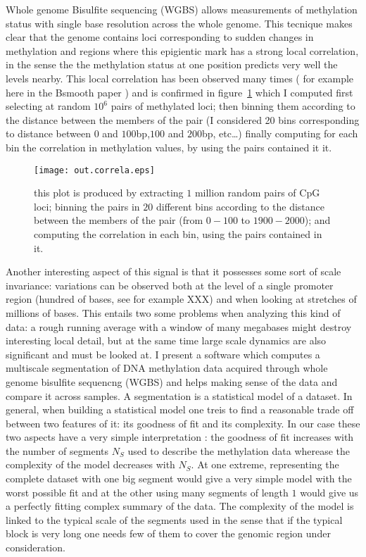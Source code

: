 \documentclass[11pt]{amsart}
\begin{document}
Whole genome Bisulfite sequencing (WGBS) allows measurements of methylation 
status with single base resolution across the whole genome. This tecnique makes 
clear that the genome contains loci corresponding to sudden changes in methylation 
and regions where this epigientic mark has a strong local
correlation, in the sense the the methylation status at one position predicts 
very well the levels nearby. 
This local correlation has been observed many times ( for example
here in the Bsmooth paper
\cite{bsmooth}) and is confirmed in figure~\ref{corr} which I computed 
first selecting at random $10^6$ pairs of  methylated loci; then binning
them according to the distance between the members of the pair (I considered 20 
bins corresponding to distance between $0$ and $100$bp,$100$ and $200$bp, etc\dots)
finally computing for each bin the correlation in methylation values, by using the pairs
contained it it.
\begin{center}
\begin{figure}\label{corr}
\texttt{[image: out.correla.eps]}
\caption{this plot is produced by extracting $1$ million random pairs of CpG loci;
binning the pairs in $20$ different bins  according to the distance between the members
of the pair (from $0-100$ to $1900-2000$); and computing the correlation in each bin,
using the pairs contained in it.}
\end{figure}
\end{center}
Another interesting aspect of this signal is that it possesses some sort of scale 
invariance: variations can be observed both at the level of a single promoter
region (hundred of bases, see for example XXX) and when looking at stretches
of millions of bases.
This entails two some problems when analyzing this kind of data: a rough
running average with a window of many megabases might destroy interesting
local detail, but at the same time large scale dynamics are also
significant and must be looked at.
I present  a software which computes a multiscale segmentation of DNA methylation 
data acquired through whole genome bisulfite sequencng (WGBS) and
helps making sense of the data and compare it across samples.
A segmentation is a statistical model of a dataset. 
In general, when building a statistical model one treis to find a reasonable 
trade off between two 
features of it: its goodness of fit and its complexity.
In our case these two aspects have a very simple interpretation : the goodness 
of fit increases with the number of segments $N_S$ used to describe the 
methylation data wherease the complexity of the model decreases with $N_S$.  
At one extreme, representing the complete dataset with one big segment would 
give a very simple model with the worst possible fit and 
at the other using many segments of length $1$ would give us a perfectly 
fitting complex summary of the data.
The complexity of the model is linked to the typical scale of the segments used
in the sense that if the typical block is very long one needs few of them to 
cover the genomic region under consideration.
\end{document}
